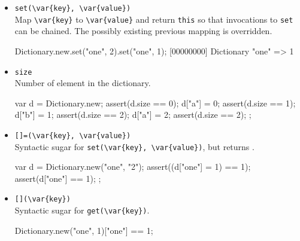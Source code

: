 \begin{itemize}
\item \lstinline|set(\var{key}, \var{value})|\\
  Map \lstinline|\var{key}| to \lstinline|\var{value}| and return
  \lstinline|this| so that invocations to \lstinline|set| can be
  chained.  The possibly existing previous mapping is overridden.

\begin{urbiscript}
Dictionary.new.set("one", 2).set("one", 1);
[00000000] Dictionary {"one" => 1}
\end{urbiscript}

\item \lstinline|size|\\
  Number of element in the dictionary.

\begin{urbiscript}
{
  var d = Dictionary.new;
  assert(d.size == 0);
  d["a"] = 0;
  assert(d.size == 1);
  d["b"] = 1;
  assert(d.size == 2);
  d["a"] = 2;
  assert(d.size == 2);
};
\end{urbiscript}

\item \lstinline|[]=(\var{key}, \var{value})|\\
  Syntactic sugar for \lstinline|set(\var{key}, \var{value})|, but
  returns .

\begin{urbiscript}
{
  var d = Dictionary.new("one", "2");
  assert((d["one"] = 1) == 1);
  assert(d["one"] == 1);
};
\end{urbiscript}

\item \lstinline|[](\var{key})|\\
  Syntactic sugar for \lstinline|get(\var{key})|.

\begin{urbiassert}
Dictionary.new("one", 1)["one"] == 1;
\end{urbiassert}

\end{itemize}


